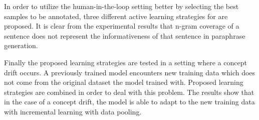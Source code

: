 In order to utilize the human-in-the-loop setting better by selecting the best samples to be annotated, three different active learning strategies for are proposed. It is clear from the experimental results that n-gram coverage of a sentence does not represent the informativeness of that sentence in paraphrase generation.

Finally the proposed learning strategies are tested in a setting where a concept drift occurs. A previously trained model encounters new training data which does not come from the original dataset the model trained with. Proposed learning strategies are combined in order to deal with this problem. The results show that in the case of a concept drift, the model is able to adapt to the new training data with incremental learning with data pooling. 

